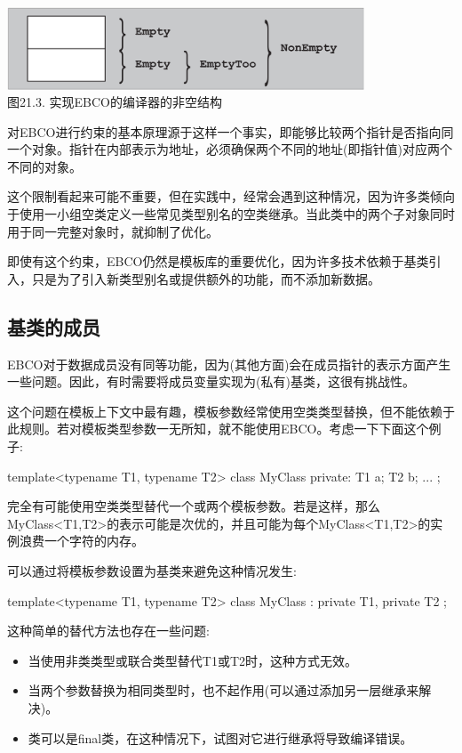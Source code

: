 \begin{center}
\includegraphics[width=0.8\textwidth]{part3/ch21/images/3.png} \\
图21.3. 实现EBCO的编译器的非空结构
\end{center}

对EBCO进行约束的基本原理源于这样一个事实，即能够比较两个指针是否指向同一个对象。指针在内部表示为地址，必须确保两个不同的地址(即指针值)对应两个不同的对象。

这个限制看起来可能不重要，但在实践中，经常会遇到这种情况，因为许多类倾向于使用一小组空类定义一些常见类型别名的空类继承。当此类中的两个子对象同时用于同一完整对象时，就抑制了优化。

即使有这个约束，EBCO仍然是模板库的重要优化，因为许多技术依赖于基类引入，只是为了引入新类型别名或提供额外的功能，而不添加新数据。

\subsection{基类的成员}

EBCO对于数据成员没有同等功能，因为(其他方面)会在成员指针的表示方面产生一些问题。因此，有时需要将成员变量实现为(私有)基类，这很有挑战性。

这个问题在模板上下文中最有趣，模板参数经常使用空类类型替换，但不能依赖于此规则。若对模板类型参数一无所知，就不能使用EBCO。考虑一下下面这个例子:

\begin{cpp}
template<typename T1, typename T2>
class MyClass {
	private:
	T1 a;
	T2 b;
	...
};
\end{cpp}

完全有可能使用空类类型替代一个或两个模板参数。若是这样，那么MyClass<T1,T2>的表示可能是次优的，并且可能为每个MyClass<T1,T2>的实例浪费一个字符的内存。

可以通过将模板参数设置为基类来避免这种情况发生:

\begin{cpp}
template<typename T1, typename T2>
class MyClass : private T1, private T2 {
};
\end{cpp}

这种简单的替代方法也存在一些问题:

\begin{itemize}
\item 
当使用非类类型或联合类型替代T1或T2时，这种方式无效。

\item 
当两个参数替换为相同类型时，也不起作用(可以通过添加另一层继承来解决)。

\item 
类可以是final类，在这种情况下，试图对它进行继承将导致编译错误。
\end{itemize}

